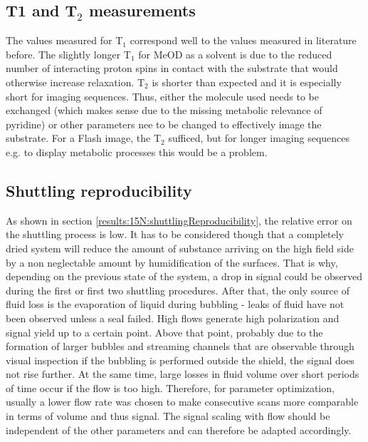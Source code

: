         \subsection{T1 and T$_2$ measurements}
        The values measured for T$_1$ correspond well to the values measured in literature before. The slightly longer T$_1$ for MeOD as a solvent is due to the reduced number of interacting proton spins in contact with the substrate that would otherwise increase relaxation. T$_2$ is shorter than expected and it is especially short for imaging sequences. Thus, either the molecule used needs to be exchanged (which makes sense due to the missing metabolic relevance of pyridine) or other parameters nee to be changed to effectively image the substrate. For a Flash image, the T$_2$ sufficed, but for longer imaging sequences e.g. to display  metabolic processes this would be a problem.
        \subsection{Shuttling reproducibility}
            As shown in section \ref{results:15N:shuttlingReproducibility}, the relative error on the shuttling process is low. It has to be considered though that a completely dried system will reduce the amount of substance arriving on the high field side by a non neglectable amount by humidification of the surfaces. That is why, depending on the previous state of the system, a drop in signal could be observed during the first or first two shuttling procedures. After that, the only source of fluid loss is the evaporation of liquid during bubbling - leaks of fluid have not been observed unless a seal failed. High flows generate high polarization  and signal yield up to a certain point. Above that point, probably due to the formation of larger bubbles and streaming channels that are observable through visual inspection if the bubbling is performed outside the shield, the signal does not rise further. At the same time, large losses in fluid volume over short periods of time occur if the flow is too high. Therefore, for parameter optimization, usually  a lower flow rate was chosen to make consecutive scans more comparable in terms of volume and thus signal. The signal scaling with flow should be independent of the other parameters and can therefore be adapted accordingly.
